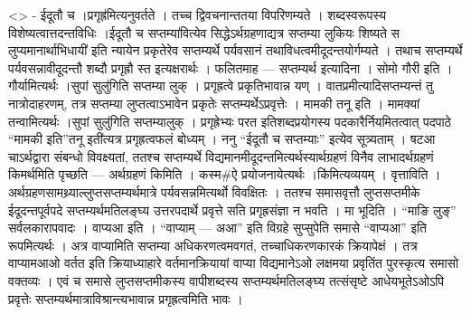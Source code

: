 \textless{}\textgreater{} - ईदूतौ च ।प्रगृह्र॑मित्यनुवर्तते । तच्च
द्विवचनान्ततया विपरिणम्यते । शब्दस्वरूपस्य विशेष्यत्वात्तदन्तविधिः
।ईदूतौ च सप्तम्या॑वित्येव सिद्धेऽर्थग्रहणाद्यत्र सप्तम्या लुकियः शिष्यते
स लुप्यमानार्थाभिधायी॑ इति न्यायेन प्रकृतेरेव सप्तम्यर्थे पर्यवसानं
तथाविधत्वमीदूदन्तयोर्गम्यते । तथाच सप्तम्यर्थे पर्यवसन्नावीदूदन्तौ शब्दौ
प्रगृह्रौ स्त इत्यक्षरार्थः । फलितमाह --- सप्तम्यर्थ इत्यादिना । सोमो
गौरी इति । गौर्यामित्यर्थः ।सुपां सुलु॑गिति सप्तम्या लुक् । प्रगृह्रत्वे
प्रकृतिभावान्न यण् । वातप्रमीत्यादिसप्तम्यन्तं तु नात्रोदाहरणम्, तत्र
सप्तम्या लुप्तत्वाऽभावेन प्रकृतेः सप्तम्यर्थेऽप्रवृत्तेः । मामकी तनू इति
। मामक्यां तन्वामित्यर्थः ।सुपां सुलु॑गिति सप्तम्यालुक् । प्रगृह्रेभ्यः
परत इतिशब्दप्रयोगस्य पदकारैर्नियमितत्वात् पदपाठे ``मामकी इति''तनू
इती॑त्यत्र प्रगृह्रत्वफलं बोध्यम् । ननु ``ईदूतौ च सप्तम्याः'' इत्येव
सूत्र्यताम् । षटआ चाऽर्थद्वारा संबन्धो विवक्ष्यतां, ततश्च सप्तम्यर्थे
विद्यमानमीदूदन्तमित्यर्थस्यार्थग्रहणं विनैव लाभादर्थग्रहणं किमर्थमिति
पृच्छति --- अर्थग्रहणं किमिति । कस्म\#ऐ प्रयोजनायेत्यर्थः
।कि॑मित्यव्ययम् । वृत्ताविति । अर्थग्रहणसामथ्र्याल्लुप्तसप्तम्यर्थमात्रे
पर्यवसन्नमित्यर्थो विवक्षितः । ततश्च समासवृत्तौ लुप्तसप्तमीके
ईदूदन्तपूर्वपदे सप्तम्यर्थमतिलङ्घ्य उत्तरपदार्थे प्रवृत्ते सति
प्रगृह्रसंज्ञा न भवति । मा भूदिति । ``माङि लुङ्'' सर्वलकारापवादः ।
वाप्यआ इति । ``वाप्याम् --- अआ'' इति विग्रहे सुप्सुपेति समासे ``वाप्यआ''
इति रूपमित्यर्थः । अत्र वाप्यामिति सप्तम्या अधिकरणत्वमवगतं,
तच्चाधिकरणकारकं क्रियापेक्षं । तत्र वाप्यामआओ वर्तत इति क्रियाध्याहारे
वर्तमानक्रियायां वाप्या विद्यमानेऽओ लक्षमया प्रवृतिंत पुरस्कृत्य समासो
वक्तव्यः । एवं च समासे लुप्तसप्तमीकस्य वापीशब्दस्य सप्तम्यर्थमतिलङ्घ्य
तत्संसृष्टे आधेयभूतेऽओऽपि प्रवृत्तेः सप्तम्यर्थमात्राविश्रान्त्यभावान्न
प्रगृह्रत्वमिति भावः ।
